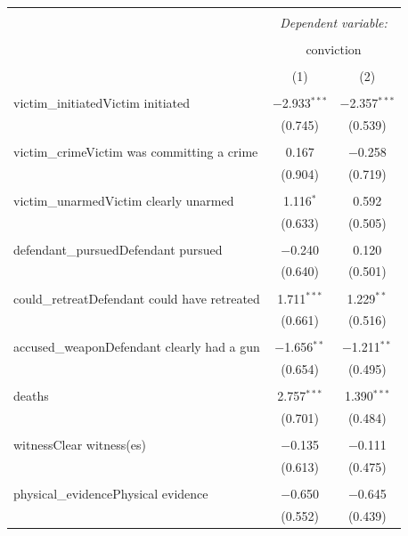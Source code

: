 \documentclass[12pt,article]{article}
\begin{document}
\begin{table}[!htbp] \centering 
  \caption{} 
  \label{} 
\footnotesize 
\begin{tabular}{@{\extracolsep{5pt}}lcc} 
\\[-1.8ex]\hline 
\hline \\[-1.8ex] 
 & \multicolumn{2}{c}{\textit{Dependent variable:}} \\ 
\cline{2-3} 
\\[-1.8ex] & \multicolumn{2}{c}{conviction} \\ 
\\[-1.8ex] & (1) & (2)\\ 
\hline \\[-1.8ex] 
 victim\_initiatedVictim initiated & $-$2.933$^{***}$ & $-$2.357$^{***}$ \\ 
  & (0.745) & (0.539) \\ 
  & & \\ 
 victim\_crimeVictim was committing a crime & 0.167 & $-$0.258 \\ 
  & (0.904) & (0.719) \\ 
  & & \\ 
 victim\_unarmedVictim clearly unarmed & 1.116$^{*}$ & 0.592 \\ 
  & (0.633) & (0.505) \\ 
  & & \\ 
 defendant\_pursuedDefendant pursued & $-$0.240 & 0.120 \\ 
  & (0.640) & (0.501) \\ 
  & & \\ 
 could\_retreatDefendant could have retreated & 1.711$^{***}$ & 1.229$^{**}$ \\ 
  & (0.661) & (0.516) \\ 
  & & \\ 
 accused\_weaponDefendant clearly had a gun & $-$1.656$^{**}$ & $-$1.211$^{**}$ \\ 
  & (0.654) & (0.495) \\ 
  & & \\ 
 deaths & 2.757$^{***}$ & 1.390$^{***}$ \\ 
  & (0.701) & (0.484) \\ 
  & & \\ 
 witnessClear witness(es) & $-$0.135 & $-$0.111 \\ 
  & (0.613) & (0.475) \\ 
  & & \\ 
 physical\_evidencePhysical evidence & $-$0.650 & $-$0.645 \\ 
  & (0.552) & (0.439) \\ 

\end{tabular}
\end{table}
\end{document}
